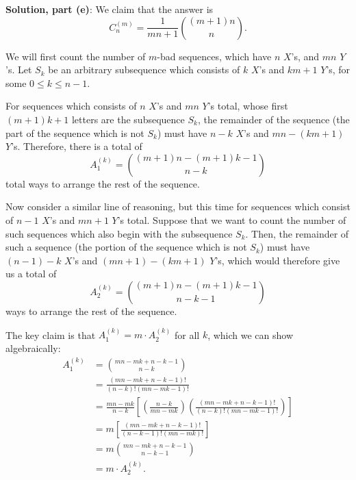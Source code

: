 \documentclass{article}
\newcommand{\V}{

\vspace{\baselineskip}

}
\begin{document}
\begin{solution} 
\textbf{Solution, part (e)}: We claim that the answer is 
\[C_n^{(m)} = \frac{1}{mn+1}\binom{(m+1)n}{n}.\]
    
We will first count the number of $m$-bad sequences, which have $n$ $X$'s, and $mn$ $Y$'s. Let $S_k$ be an arbitrary subsequence which consists of $k$ $X$'s and $km+1$ $Y$'s, for some $0\leq k\leq n-1$.\V
    
For sequences which consists of $n$ $X$'s and $mn$ $Y$'s total, whose first $(m+1)k+1$ letters are the subsequence $S_k$, the remainder of the sequence (the part of the sequence which is not $S_k$) must have $n-k$ $X$'s and $mn-(km+1)$ $Y$'s. Therefore, there is a total of \[A_1^{(k)} = \binom{(m+1)n-(m+1)k-1}{n-k}\]total ways to arrange the rest of the sequence. \V
    
Now consider a similar line of reasoning, but this time for sequences which consist of $n-1$ $X$'s and $mn+1$ $Y$'s total. Suppose that we want to count the number of such sequences which also begin with the subsequence $S_k$. Then, the remainder of such a sequence (the portion of the sequence which is not $S_k$) must have $(n-1) - k$ $X$'s and $(mn+1) - (km+1)$ $Y$'s, which would therefore give us a total of 
\[A_2^{(k)} = \binom{(m+1)n - (m+1)k - 1}{n-k-1}\] ways to arrange the rest of the sequence.\V
    
The key claim is that $A_1^{(k)} = m\cdot A_2^{(k)}$ for all $k$, which we can show algebraically: 
\begin{align*}
    A_1^{(k)} &= \binom{mn-mk+n-k-1}{n-k} \\
    &= \frac{(mn-mk+n-k-1)!}{(n-k)!(mn-mk-1)!}\\
    &= \frac{mn-mk}{n-k}\left[\left(\frac{n-k}{mn-mk}\right)\left( \frac{(mn-mk+n-k-1)!}{(n-k)!(mn-mk-1)!}\right)\right]\\
    &= m\left[\frac{(mn-mk+n-k-1)!}{(n-k-1)!(mn-mk)!}\right]\\
    &= m\binom{mn-mk+n-k-1}{n-k-1} \\
    &= m\cdot A_2^{(k)}.
\end{align*}
    

\end{solution}
\end{document}
